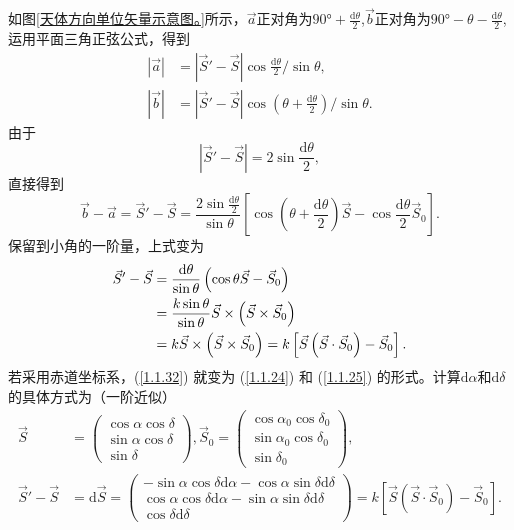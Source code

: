 \documentclass[11pt, a4paper, oneside]{ctexart}
\numberwithin{equation}{subsection}
\begin{document}
如图\ref{天体方向单位矢量示意图。}所示，$\vec{a}$正对角为$\ang{90;;}+\frac{\mathrm{d}\theta}{2}$,$\vec{b}$正对角为$\ang{90;;}-\theta-\frac{\mathrm{d}\theta}{2}$,运用平面三角正弦公式，得到
\begin{align}
\left\vert{}\vec a\right\vert{}&=\left\vert{}\vec S'-\vec S\right\vert{}\cos\frac{\mathrm{d}\theta}{2}/\sin\theta,\\
\left\vert{}\vec b\right\vert{}&=\left\vert{}\vec S'-\vec S\right\vert{}\cos\left(\theta+\frac{\mathrm{d}\theta}{2}\right)/\sin\theta.
\end{align}
由于
\begin{equation}
\left\vert{}\vec S'-\vec S\right\vert{}=2\sin\frac{\mathrm{d}\theta}{2},
\end{equation}
直接得到
\begin{equation}
\vec{b}-\vec{a}=\vec{S}'-\vec{S}=\frac{2\sin\frac{\mathrm{d}\theta}{2}}{\sin\theta}\left[\cos\left(\theta+\frac{\mathrm{d}\theta}{2}\right)\vec{S}-\cos\frac{\mathrm{d}\theta}{2}\vec{S}_{0}\right].
\end{equation}
保留到小角的一阶量，上式变为
\begin{align}
\vec{S}'-\vec{S}&=\frac{\mathrm{d}\theta}{\sin\theta}\left(\cos\theta\vec{S}-\vec{S}_{0}\right)\notag\\
&=\frac{k\sin\theta}{\sin\theta}\vec{S}\times\left(\vec{S}\times\vec{S}_{0}\right)\notag\\
&=k\vec{S}\times\left(\vec{S}\times\vec{S}_{0}\right)=k\left[\vec{S}\left(\vec{S}\cdot\vec{S}_{0}\right)-\vec{S}_{0}\right].\label{1.1.32}
\end{align}
若采用赤道坐标系，(\ref{1.1.32}) 就变为 (\ref{1.1.24}) 和 (\ref{1.1.25}) 的形式。计算$\mathrm{d}\alpha$和$\mathrm{d}\delta{}$的具体方式为（一阶近似）
\begin{align}
\vec S&=\begin{pmatrix}
\cos\alpha\cos\delta\\
\sin\alpha\cos\delta\\
\sin\delta
\end{pmatrix},
\vec S_{0}=\begin{pmatrix}
\cos\alpha_{0}\cos\delta_{0}\\
\sin\alpha_{0}\cos\delta_{0}\\
\sin\delta_{0}
\end{pmatrix},\\
\vec S'-\vec S&=\mathrm{d}\vec S=\begin{pmatrix}
-\sin\alpha\cos\delta\mathrm{d}\alpha-\cos\alpha\sin\delta\mathrm{d}\delta\\
\cos\alpha\cos\delta\mathrm{d}\alpha-\sin\alpha\sin\delta\mathrm{d}\delta\\
\cos\delta\mathrm{d}\delta
\end{pmatrix}=k\left[\vec{S}\left(\vec{S}\cdot\vec{S}_{0}\right)-\vec{S}_{0}\right].
\end{align}
\end{document}
